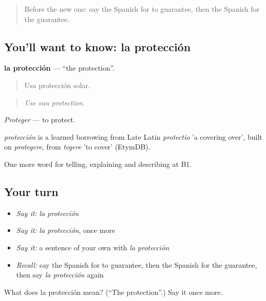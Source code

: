 \label{lesson:ES-C614-proteccion}



\begin{quote}
Before the new one: say the Spanish for to guarantee, then the Spanish for the guarantee.
\end{quote}

\subsection*{You'll want to know: la protección}
\textbf{la protección} — \textquotedblleft{}the protection\textquotedblright{}.

\begin{quote}
Usa protección solar.
\end{quote}

\begin{quote}
\emph{Use sun protection.}
\end{quote}

\emph{Proteger} — to protect.

\begin{cousinweb}
\emph{protección} is a learned borrowing from Late Latin \emph{protectio} 'a covering over', built on \emph{protegere}, from \emph{tegere} 'to cover' (EtymDB).
\end{cousinweb}

\begin{grammarlens}[title={What you've built}]
One more word for telling, explaining and describing at B1.
\end{grammarlens}

\subsection*{Your turn}
\begin{itemize}
\raggedright
  \item \emph{Say it:} \emph{la protección}
  \item \emph{Say it:} \emph{la protección}, once more
  \item \emph{Say it:} a sentence of your own with \emph{la protección}
  \item \emph{Recall:} say the Spanish for to guarantee, then the Spanish for the guarantee, then say \emph{la protección} again
\end{itemize}

\begin{tcolorbox}[breakable,colback=teal!4,colframe=teal!35!black,title={Before you move on}]
What does la protección mean? (\textquotedblleft{}The protection\textquotedblright{}.) Say it once more.
\end{tcolorbox}
